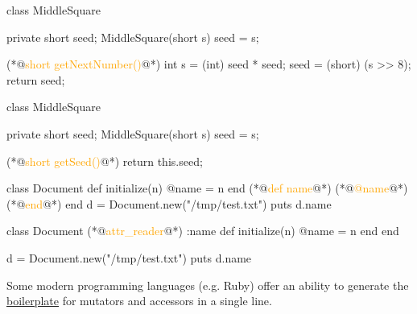 \documentclass{article}
\begin{document}
\begin{pptWide}{2}
{\small\begin{ffcode}
class MiddleSquare {
  private short seed;
  MiddleSquare(short s) { seed = s; }

  (*@\textcolor{orange}{short getNextNumber()}@*) {
    int s = (int) seed * seed;
    seed = (short) (s >> 8);
    return seed;
  }
}
\end{ffcode}
}
\par\columnbreak\par
{\small\begin{ffcode}
class MiddleSquare {
  private short seed;
  MiddleSquare(short s) { seed = s; }

  (*@\textcolor{orange}{short getSeed()}@*) {
    return this.seed;
  }
}
\end{ffcode}
}
\end{pptWide}
\par
\plush{}

\begin{pptWide}{2}
{\small\begin{ffcode}
class Document
  def initialize(n)
    @name = n
  end
  (*@\textcolor{orange}{def name}@*)
    (*@\textcolor{orange}{@name}@*)
  (*@\textcolor{orange}{end}@*)
end
d = Document.new("/tmp/test.txt")
puts d.name
\end{ffcode}
}
\par\columnbreak\par
{\small\begin{ffcode}
class Document
  (*@\textcolor{orange}{attr\_reader}@*) :name
  def initialize(n)
    @name = n
  end
end

d = Document.new("/tmp/test.txt")
puts d.name
\end{ffcode}
}
\end{pptWide}
\par
Some modern programming languages (e.g. Ruby) offer an ability to generate the \ul{boilerplate} for mutators and accessors in a single line.
\plush{}

\end{document}
